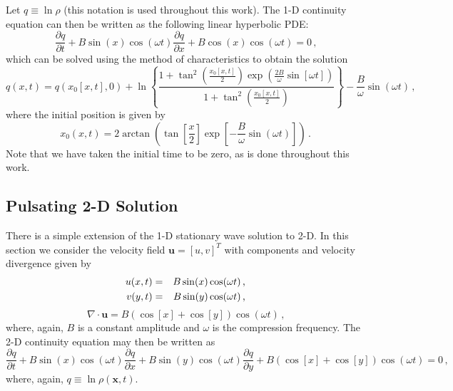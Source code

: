 \documentclass[11pt]{book}
\begin{document}
Let $q \equiv \ln \rho$ (this notation is used throughout this work).  The 1-D continuity equation can then be written as the following linear hyperbolic PDE:
\begin{equation}
\label{eqn_cont1d}
\frac{\partial q}{\partial t} + B \sin(x) \cos(\omega t) \frac{\partial q}{\partial x} + B \cos(x) \cos(\omega t) = 0 \,\mbox{,}
\end{equation}
which can be solved using the method of characteristics to obtain the solution
\begin{equation}
\label{eqn_1dsoln}
q(x,t) = q(x_0[x,t],0) + \ln \left\{ \frac{ 1 + \tan^2\left(\frac{x_0[x,t]}{2}\right) \exp\left(\frac{2B}{\omega}\sin[\omega t]\right) }{ 1 + \tan^2\left(\frac{x_0[x,t]}{2}\right) } \right\} - \frac{B}{\omega} \sin(\omega t) \,\mbox{,}
\end{equation}
where the initial position is given by
\begin{equation}
\label{eqn_initialposition1d}
x_0(x,t) = 2 \arctan\left( \tan\left[\frac{x}{2}\right] \exp\left[-\frac{B}{\omega}\sin(\omega t)\right] \right) \,\mbox{.}
\end{equation}
Note that we have taken the initial time to be zero, as is done throughout this work.


\subsection{Pulsating 2-D Solution}
\label{soln_2d}

There is a simple extension of the 1-D stationary wave solution to 2-D. In this section we consider the velocity field $\mathbf{u}=[u,v]^T$ with components and velocity divergence given by
\begin{eqnarray}
\label{eqn_u2d}
u(x,t) &=& B \sin(x) \cos(\omega t) \,\mbox{,} \vspace{0.2cm}\\
v(y,t) &=& B \sin(y) \cos(\omega t) \,\mbox{,}
\end{eqnarray}
\begin{equation}
\label{eqn_div2d}
\nabla\cdot\mathbf{u} = B(\cos[x] + \cos[y]) \cos(\omega t) \,\mbox{,}
\end{equation}
where, again, $B$ is a constant amplitude and $\omega$ is the compression frequency.  The 2-D continuity equation may then be written as
\begin{equation}
\label{eqn_cont2d}
\frac{\partial q}{\partial t} + B \sin(x) \cos(\omega t) \frac{\partial q}{\partial x} + B \sin(y) \cos(\omega t) \frac{\partial q}{\partial y} + B( \cos[x] + \cos[y]) \cos(\omega t) = 0 \,\mbox{,}
\end{equation}
where, again, $q \equiv \ln \rho(\mathbf{x},t)$.
\end{document}
